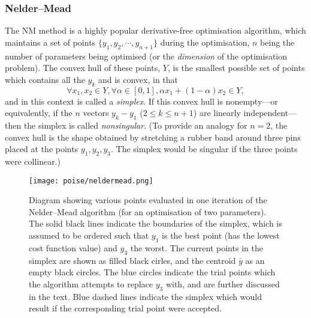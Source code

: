 \subsubsection{Nelder--Mead}

The NM method is a highly popular derivative-free optimisation algorithm, which maintains a set of points $\{y_1, y_2, \cdots, y_{n+1}\}$ during the optimisation, $n$ being the number of parameters being optimised (or the \textit{dimension} of the optimisation problem).
The convex hull of these points, $Y$, is the smallest possible set of points which contains all the $y_k$ and is convex, in that
\begin{equation}
    \label{eq:convex_hull}
    \forall x_1, x_2 \in Y, \forall \alpha \in [0, 1], \alpha x_1 + (1 - \alpha) x_2 \in Y,
\end{equation}
and in this context is called a \textit{simplex}.
If this convex hull is nonempty---or equivalently, if the $n$ vectors $y_k - y_1$ ($2 \leq k \leq n + 1$) are linearly independent---then the simplex is called \textit{nonsingular}.
(To provide an analogy for $n = 2$, the convex hull is the shape obtained by stretching a rubber band around three pins placed at the points $y_1, y_2, y_3$.
The simplex would be singular if the three points were collinear.)

\begin{figure}[htb]
    \centering
    \texttt{[image: poise/neldermead.png]}%
    \caption[Trial points in an iteration of the Nelder--Mead algorithm]{
        Diagram showing various points evaluated in one iteration of the Nelder--Mead algorithm (for an optimisation of two parameters).
        The solid black lines indicate the boundaries of the simplex, which is assumed to be ordered such that $y_1$ is the best point (has the lowest cost function value) and $y_3$ the worst.
        The current points in the simplex are shown as filled black cirles, and the centroid $\bar{y}$ as an empty black circles.
        The blue circles indicate the trial points which the algorithm attempts to replace $y_3$ with, and are further discussed in the text.
        Blue dashed lines indicate the simplex which would result if the corresponding trial point were accepted.
    }
    \label{fig:neldermead}
\end{figure}

